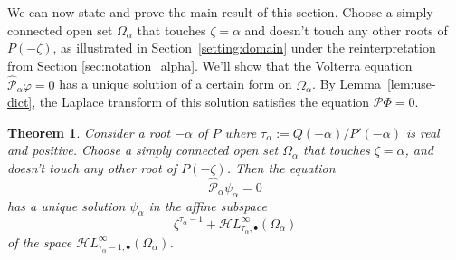 \documentclass{article}
\theoremstyle{plain}
\newtheorem{thm}{Theorem}
\newcommand{\singexp}[2]{\mathcal{H}L^\infty_{#1, #2}}
\newcommand{\singexpalg}[1]{\singexp{#1}{\bullet}}
\newcommand{\domain}{\Omega}
\begin{document}
We can now state and prove the main result of this section. Choose a simply connected open set $\domain_\alpha$ that touches $\zeta = \alpha$ and doesn't touch any other roots of $P(-\zeta)$, as illustrated in Section~\ref{setting:domain} under the reinterpretation from Section \ref{sec:notation_alpha}. We'll show that the Volterra equation $\hat{\mathcal{P}}_\alpha \varphi = 0$ has a unique solution of a certain form on $\domain_\alpha$. By Lemma~\ref{lem:use-dict}, the Laplace transform of this solution satisfies the equation $\mathcal{P}\Phi = 0$.
\begin{thm}\label{thm:example}
Consider a root $-\alpha$ of $P$ where $\tau_\alpha := Q(-\alpha)/P'(-\alpha)$ is real and positive. Choose a simply connected open set $\domain_\alpha$ that touches $\zeta = \alpha$, and doesn't touch any other root of $P(-\zeta)$. Then the equation
\[ \hat{\mathcal{P}}_\alpha \psi_\alpha = 0 \]
has a unique solution $\psi_\alpha$ in the affine subspace
\[ \zeta^{\tau_\alpha-1} + \singexpalg{\tau_\alpha}(\domain_\alpha) \]
of the space $\singexpalg{\tau_\alpha-1}(\domain_\alpha)$.
\end{thm}
\end{document}

